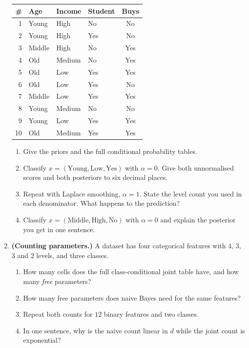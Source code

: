 \documentclass[11pt]{article}
\begin{document}
\begin{enumerate}[leftmargin=*, itemsep=0.55em]
  \begin{center}\small
  \begin{tabular}{@{}rlllc@{}}
  \toprule
  \# & Age & Income & Student & \textbf{Buys}\\
  \midrule
  1 & Young & High & No & No\\
  2 & Young & High & Yes & No\\
  3 & Middle & High & No & Yes\\
  4 & Old & Medium & No & Yes\\
  5 & Old & Low & Yes & Yes\\
  6 & Old & Low & Yes & No\\
  7 & Middle & Low & Yes & Yes\\
  8 & Young & Medium & No & No\\
  9 & Young & Low & Yes & Yes\\
  10 & Old & Medium & Yes & Yes\\
  \bottomrule
  \end{tabular}
  \end{center}

  \begin{enumerate}[label=(\alph*)]
    \item Give the priors and the full conditional probability tables.
    \item Classify $x = (\text{Young}, \text{Low}, \text{Yes})$ with
      $\alpha = 0$. Give both unnormalised scores and both posteriors to six
      decimal places.
    \item Repeat with Laplace smoothing, $\alpha = 1$. State the level count
      you used in each denominator. What happens to the prediction?
    \item Classify $x = (\text{Middle}, \text{High}, \text{No})$ with
      $\alpha = 0$ and explain the posterior you get in one sentence.
  \end{enumerate}

\item \textbf{(Counting parameters.)} A dataset has four categorical features
  with $4$, $3$, $3$ and $2$ levels, and three classes.
  \begin{enumerate}[label=(\alph*)]
    \item How many cells does the full class-conditional joint table have,
      and how many \emph{free} parameters?
    \item How many free parameters does naive Bayes need for the same
      features?
    \item Repeat both counts for $12$ binary features and two classes.
    \item In one sentence, why is the naive count linear in $d$ while the
      joint count is exponential?
  \end{enumerate}


\end{enumerate}
\end{document}
